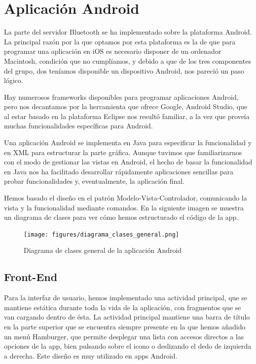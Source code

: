 \cleardoublepage

\chapter{Aplicación Android}
\label{makereference6}

La parte del servidor Bluetooth se ha implementado sobre la plataforma Android. La principal razón por la que optamos por esta plataforma es la de que para programar una aplicación en iOS es necesario disponer de un ordenador Macintosh, condición que no cumplíamos, y debido a que de los tres componentes del grupo, dos teníamos disponible un dispositivo Android, nos pareció un paso lógico.

Hay numerosos frameworks disponibles para programar aplicaciones Android, pero nos decantamos por la herramienta que ofrece Google, Android Studio, que al estar basado en la plataforma Eclipse nos resultó familiar, a la vez que proveía muchas funcionalidades específicas para Android.

Una aplicación Android se implementa en Java para especificar la funcionalidad y en XML para estructurar la parte gráfica. Aunque tuvimos que familiarizarnos con el modo de gestionar las vistas en Android, el hecho de basar la funcionalidad en Java nos ha facilitado desarrollar rápidamente aplicaciones sencillas para probar funcionalidades y, eventualmente, la aplicación final. 

Hemos basado el diseño en el patrón Modelo-Vista-Controlador, comunicando la vista y la funcionalidad mediante comandos. En la siguiente imagen se muestra un diagrama de clases para ver cómo hemos estructurado el código de la app.

\begin{figure}[h]%
	\centering
    \texttt{[image: figures/diagrama\_clases\_general.png]} %
    \caption[Diagrama de clases general de la aplicación Android]{Diagrama de clases general de la aplicación Android}
   	\label{figuraDiagramaClasesGeneral}
\end{figure}

\section{Front-End}
\label{makereference6.1}

Para la interfaz de usuario, hemos implementado una actividad principal, que se mantiene estática durante toda la vida de la aplicación, con fragmentos que se van cargando dentro de ésta. La actividad principal mantiene una barra de título en la parte superior que se encuentra siempre presente en la que hemos añadido un menú Hamburger, que permite desplegar una lista con accesos directos a las opciones de la app, bien pulsando sobre el icono o deslizando el dedo de izquierda a derecha. Este diseño es muy utilizado en apps Android.

